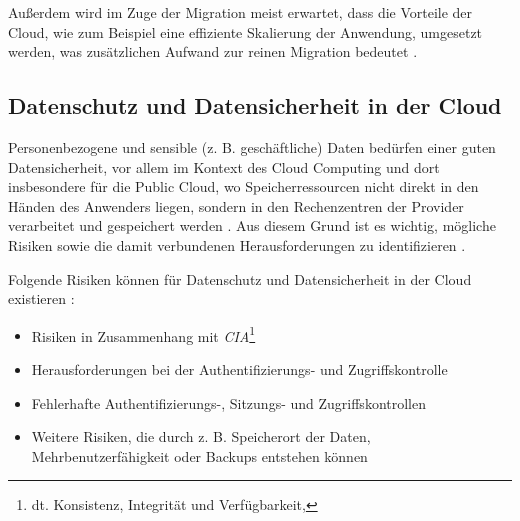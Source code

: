 Außerdem wird im Zuge der Migration meist erwartet, dass die Vorteile der Cloud, wie zum Beispiel eine effiziente Skalierung der Anwendung, umgesetzt werden, was zusätzlichen Aufwand zur reinen Migration bedeutet \cite[Vgl.][]{Ibryam2021}. \pagebreak

\subsection{Datenschutz und Datensicherheit in der Cloud}
Personenbezogene und sensible (z. B. geschäftliche) Daten bedürfen einer guten Datensicherheit, vor allem im Kontext des Cloud Computing und dort insbesondere für die Public Cloud, wo Speicherressourcen nicht direkt in den Händen des Anwenders liegen, sondern in den Rechenzentren der Provider verarbeitet und gespeichert werden \cite[Vgl.][S. 1ff]{Sun2019}. Aus diesem Grund ist es wichtig, mögliche Risiken sowie die damit verbundenen Herausforderungen zu identifizieren \cite[Vgl.][S. 3]{Sun2019}.

Folgende Risiken können für Datenschutz und Datensicherheit in der Cloud existieren \cite[Vgl. auch im folgenden][S. 694]{Kumar2018}:

\begin{itemize}
    \item Risiken in Zusammenhang mit \textit{\ac{CIA}}\footnote{dt. Konsistenz, Integrität und Verfügbarkeit, }
    \item Herausforderungen bei der Authentifizierungs- und Zugriffskontrolle
    \item Fehlerhafte Authentifizierungs-, Sitzungs- und Zugriffskontrollen
    \item Weitere Risiken, die durch z. B. Speicherort der Daten, Mehrbenutzerfähigkeit oder Backups entstehen können
\end{itemize}

\pagebreak